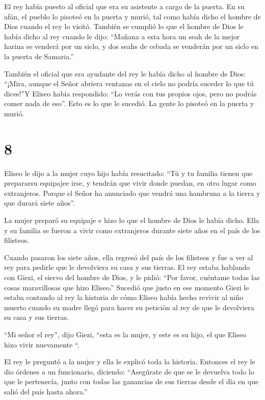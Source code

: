  El rey había puesto al oficial que era su asistente a
cargo de la puerta. En su afán, el pueblo lo pisoteó en la puerta y
murió, tal como había dicho el hombre de Dios cuando el rey lo visitó.
 También se cumplió lo que el hombre de Dios le había dicho
al rey cuando le dijo: ``Mañana a esta hora un seah de la mejor harina
se venderá por un siclo, y dos seahs de cebada se venderán por un siclo
en la puerta de Samaria.''

 También el oficial que era ayudante del rey le había dicho
al hombre de Dios: ``¡Mira, aunque el Señor abriera ventanas en el cielo
no podría suceder lo que tú dices!''Y Eliseo había respondido: ``Lo
verás con tus propios ojos, pero no podrás comer nada de eso''.
 Esto es lo que le sucedió. La gente lo pisoteó en la
puerta y murió.

\hypertarget{section-7}{%
\section{8}\label{section-7}}

 Eliseo le dijo a la mujer cuyo hijo había resucitado: ``Tú
y tu familia tienen que prepararsu equipajee irse, y tendrán que vivir
donde puedan, en otro lugar como extranjeros. Porque el Señor ha
anunciado que vendrá una hambruna a la tierra y que durará siete años''.

 La mujer preparó su equipaje e hizo lo que el hombre de
Dios le había dicho. Ella y su familia se fueron a vivir como
extranjeros durante siete años en el país de los filisteos.

 Cuando pasaron los siete años, ella regresó del país de los
filisteos y fue a ver al rey para pedirle que le devolviera su casa y
sus tierras.  El rey estaba hablando con Giezi, el siervo
del hombre de Dios, y le pidió: ``Por favor, cuéntame todas las cosas
maravillosas que hizo Eliseo.''  Sucedió que justo en ese
momento Giezi le estaba contando al rey la historia de cómo Eliseo había
hecho revivir al niño muerto cuando su madre llegó para hacer su
petición al rey de que le devolviera su casa y sus tierras.

``Mi señor el rey'', dijo Giezi, ``esta es la mujer, y este es su hijo,
el que Eliseo hizo vivir nuevamente ``.

 El rey le preguntó a la mujer y ella le explicó toda la
historia. Entonces el rey le dio órdenes a un funcionario, diciendo:
``Asegúrate de que se le devuelva todo lo que le pertenecía, junto con
todas las ganancias de sus tierras desde el día en que salió del país
hasta ahora.''

